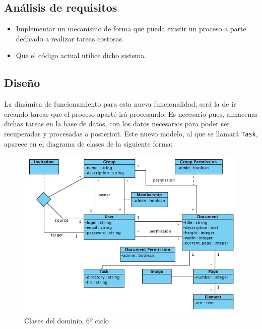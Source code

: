 \subsection{Análisis de requisitos} %
\label{sub:análisis_de_requisitos}

\begin{itemize}
  \item Implementar un mecanismo de forma que pueda existir un proceso a parte dedicado a realizar tareas costosas.
  \item Que el código actual utilice dicho sistema.
\end{itemize}


\subsection{Diseño} %
\label{sub:diseño}

La dinámica de funcionamiento para esta nueva funcionalidad, será la de ir creando tareas que el proceso aparté irá procesando. Es necesario pues, almacenar dichas tareas en la base de datos, con los datos necesarios para poder ser recuperadas y procesadas a posteriori. Este nuevo modelo, al que se llamará \texttt{Task}, aparece en el diagrama de clases de la siguiente forma:

\begin{figure}[h!]
\centering
\includegraphics[width=14cm]{uml6.png}
\caption{Clases del dominio, 6º ciclo}\label{fig:uml6}
\end{figure}

